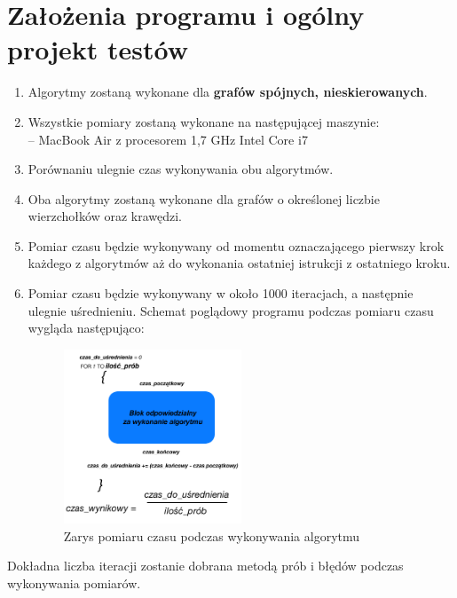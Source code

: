 \section{Założenia programu i ogólny projekt testów}
\begin{enumerate}
	\item Algorytmy zostaną wykonane dla \textbf{grafów spójnych, nieskierowanych}.
	\item Wszystkie pomiary zostaną wykonane na następującej maszynie:\\
	-- MacBook Air z procesorem 1,7 GHz Intel Core i7\\
	\item Porównaniu ulegnie czas wykonywania obu algorytmów.
	\item Oba algorytmy zostaną wykonane dla grafów o określonej liczbie wierzchołków oraz krawędzi.
	\item Pomiar czasu będzie wykonywany od momentu oznaczającego pierwszy krok każdego z algorytmów aż do wykonania ostatniej istrukcji z ostatniego kroku.
	\item Pomiar czasu będzie wykonywany w około 1000 iteracjach, a następnie ulegnie uśrednieniu. Schemat poglądowy programu podczas pomiaru czasu wygląda następująco:\\
	
	\begin{figure}[htb!]
		\centering
		\includegraphics[width=0.5\textwidth]{tex/fig/time}
		\caption{Zarys pomiaru czasu podczas wykonywania algorytmu}
		\label{fig: time}
	\end{figure}

\end{enumerate}
Dokładna liczba iteracji zostanie dobrana metodą prób i błędów podczas wykonywania pomiarów.
